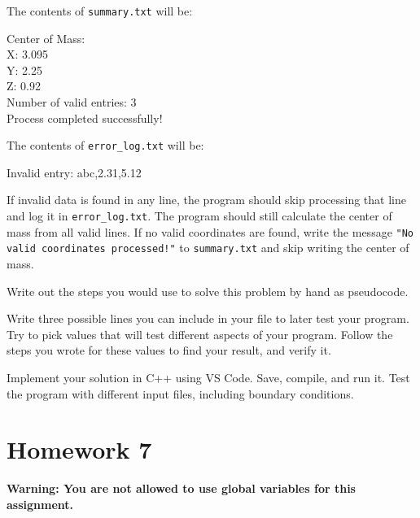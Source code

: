 The contents of \texttt{summary.txt} will be:
\begin{sample}
Center of Mass:\\
X: 3.095\\
Y: 2.25\\
Z: 0.92\\

Number of valid entries: 3\\
Process completed successfully!
\end{sample}

The contents of \texttt{error_log.txt} will be:
\begin{sample}
Invalid entry: abc,2.31,5.12\\
\end{sample}

If invalid data is found in any line, the program should skip processing that line and log it in \texttt{error_log.txt}. The program should still calculate the center of mass from all valid lines. If no valid coordinates are found, write the message \texttt{"No valid coordinates processed!"} to \texttt{summary.txt} and skip writing the center of mass.

\begin{multipart}
    Write out the steps you would use to solve this problem by hand as pseudocode.
\end{multipart}

\vspace{8cm}

\begin{multipart}
    Write three possible lines you can include in your file to later test your program. Try to pick values that will test different aspects of your program. Follow the steps you wrote for these values to find your result, and verify it.
\end{multipart}

\vspace{5cm}

\begin{multipart}
    Implement your solution in C++ using VS Code. Save, compile, and run it. Test the program with different input files, including boundary conditions.
\end{multipart}

\newpage

\section{Homework 7}
\textbf{Warning: You are not allowed to use global variables for this assignment.}

